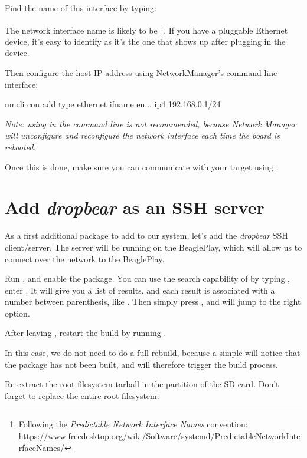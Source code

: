 Find the name of this interface by typing:

The network interface name is likely to be
\footnote{Following the {\em Predictable Network Interface
Names} convention:
\url{https://www.freedesktop.org/wiki/Software/systemd/PredictableNetworkInterfaceNames/}}.
If you have a pluggable Ethernet device, it's easy to identify as it's
the one that shows up after plugging in the device.

Then configure the host IP address using NetworkManager's command line
interface:

\begin{bashinput}
nmcli con add type ethernet ifname en... ip4 192.168.0.1/24
\end{bashinput}

{\em Note: using  in the command line is not
recommended, because Network Manager will unconfigure and
reconfigure the network interface each time the board is rebooted.}

Once this is done, make sure you can communicate with your target
using .

\section{Add {\em dropbear} as an SSH server}

As a first additional package to add to our system, let's add the {\em
dropbear} SSH client/server. The server will be running on the
BeaglePlay, which will allow us to connect over the network to the
BeaglePlay.

Run , and enable the 
package. You can use the search capability of  by
typing \code{/}, enter . It will give you a list of
results, and each result is associated with a number between
parenthesis, like . Then simply press , and
 will jump to the right option.

After leaving , restart the build by running
.

In this case, we do not need to do a full rebuild, because a simple
 will notice that the  package has not been
built, and will therefore trigger the build process.

Re-extract the root filesystem tarball in the  partition
of the SD card. Don't forget to replace the entire root filesystem:

